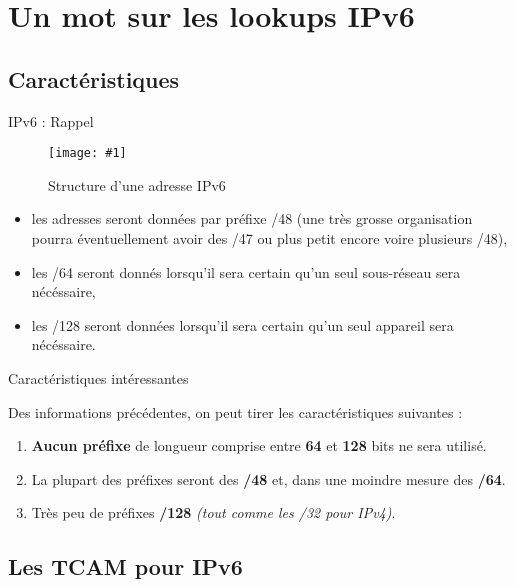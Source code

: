 \documentclass{beamer}
\newcommand{\imageR}[2]{\texttt{[image: \#1]}}
\newcommand{\term}[1]{\textit{\textcolor{maintitle}{#1}}}
\begin{document}
\section{Un mot sur les lookups IPv6}

\subsection{Caractéristiques}

\begin{frame}{IPv6 : Rappel}
\begin{figure}
	\begin{center}
	\imageR{CN_009.png}{200}
	\caption{Structure d'une adresse IPv6}
	\end{center}	
\end{figure}

\begin{itemize}
\item les adresses seront données par préfixe /48 (une très grosse organisation pourra éventuellement avoir des /47 ou plus 
petit encore voire plusieurs /48),
\item les /64 seront donnés lorsqu'il sera certain qu'un seul sous-réseau sera nécéssaire,
\item les /128 seront données lorsqu'il sera certain qu'un seul appareil sera nécéssaire.
\end{itemize}

\end{frame}

\begin{frame}{Caractéristiques intéressantes}

Des informations précédentes, on peut tirer les caractéristiques suivantes : 
\begin{enumerate}
\item \textbf{Aucun préfixe} de longueur comprise entre \textbf{64} et \textbf{128} bits ne sera utilisé.
\pause \item La plupart des préfixes seront des \textbf{/48} et, dans une moindre mesure des \textbf{/64}.
\pause \item Très peu de préfixes \textbf{/128} \textit{(tout comme les /32 pour \term{IPv4})}.
\end{enumerate}

\end{frame}

\subsection{Les TCAM pour IPv6}
\end{document}
